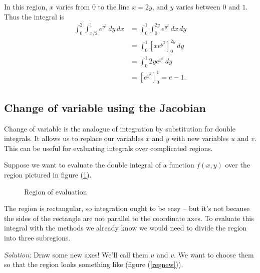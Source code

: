 \begin{examples}
\begin{enumerate}
    In this region, $x$ varies from $0$ to the line $x = 2y$, and $y$ varies between $0$ and $1$.  Thus the integral is
      \begin{align*}
        \int_0^2 \int_{x/2}^1 e^{y^2} \, dy \, dx & = \int_0^1 \int_0^{2y} e^{y^2} \, dx \, dy  \\
        & = \int_0^1 \left[ xe^{y^2} \right]_0^{2y} \, dy  \\
        & = \int_0^1 2ye^{y^2} \, dy  \\
        & = \left[ e^{y^2} \right]_0^1 = e - 1.
      \end{align*}
    \end{enumerate}  
  \end{examples}



\subsection{Change of variable using the Jacobian}  \label{sect:Jacobian}

  Change of variable is the analogue of integration by substitution for double integrals.  It allows us to replace our variables $x$ and $y$ with new variables $u$ and $v$.  This can be useful for evaluating integrals over complicated regions.

  Suppose we want to evaluate the double integral of a function $f(x, y)$ over the region pictured in figure (\ref{regeval}).

  \begin{figure}[!htpb]
    \centering
    \def\svgwidth{0.6\columnwidth}
    
    \caption{Region of evaluation}
    \label{regeval}
  \end{figure}

  The region is rectangular, so integration ought to be easy -- but it's not because the sides of the rectangle are not parallel to the coordinate axes.  To evaluate this integral with the methods we already know we would need to divide the region into three subregions.

  \emph{Solution:}  Draw some new axes!  We'll call them $u$ and $v$.  We want to choose them so that the region looks something like (figure (\ref{regnew})). 


